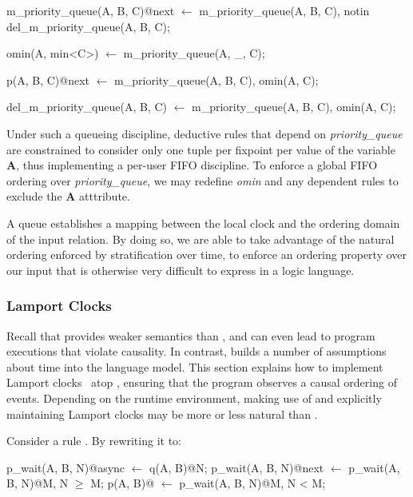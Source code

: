\begin{Dedalus}

m\_priority\_queue(A, B, C)@next \(\leftarrow\)
  m\_priority\_queue(A, B, C),
  notin del\_m\_priority\_queue(A, B, C);

omin(A, min<C>) \(\leftarrow\)
  m\_priority\_queue(A, _, C);

p(A, B, C)@next \(\leftarrow\)
  m\_priority\_queue(A, B, C),
  omin(A, C);

del\_m\_priority\_queue(A, B, C) \(\leftarrow\)
  m\_priority\_queue(A, B, C),
  omin(A, C);
\end{Dedalus}

Under such a queueing discipline, deductive rules that depend on
\emph{priority\_queue} are constrained to consider only one tuple per fixpoint
per value of the variable \textbf{A}, thus implementing a per-user FIFO
discipline.  To enforce a global FIFO ordering over \emph{priority\_queue}, we
may redefine \emph{omin} and any dependent rules to exclude the \textbf{A}
atttribute.

A queue establishes a mapping between the local clock and the ordering domain of the input relation. By doing so, we are able to take
advantage of the natural ordering enforced by stratification over time, to enforce an ordering property over our input that is otherwise 
very difficult to express in a logic language.

\subsubsection{Lamport Clocks}
Recall that  provides weaker semantics than
, and can even lead to program executions that violate
causality.  In contrast,  builds a number of
assumptions about time into the language model.  This section explains
how to implement Lamport clocks~\cite{timeclocks} atop
, ensuring that the program observes a causal ordering
of events.  Depending on the runtime environment, making use of
 and explicitly maintaining Lamport clocks may be more
or less natural than .

Consider a rule .  By
rewriting it to:

\begin{Dedalus}
p\_wait(A, B, N)@async \(\leftarrow\) q(A, B)@N;
p\_wait(A, B, N)@next \(\leftarrow\) p\_wait(A, B, N)@M, N \(\ge\) M;
p(A, B)@ \(\leftarrow\) p\_wait(A, B, N)@M, N < M;
\end{Dedalus}

